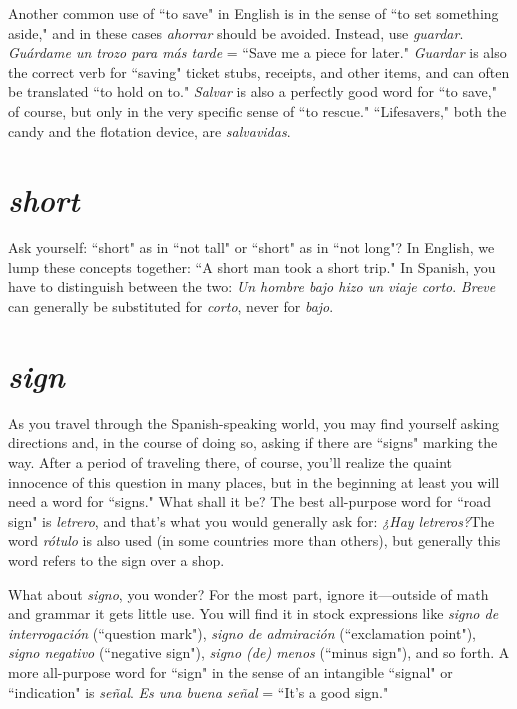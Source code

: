 Another common use of ``to save" in English is in the sense of
``to set something aside," and in these cases \emph{ahorrar} should be avoided.
Instead, use \emph{guardar}. \emph{Guárdame un trozo para más tarde} = ``Save me
a piece for later." \emph{Guardar} is also the correct verb for ``saving" ticket
stubs, receipts, and other items, and can often be translated ``to hold
on to." \emph{Salvar} is also a perfectly good word for ``to save," of course, but
only in the very specific sense of ``to rescue." ``Lifesavers," both the
candy and the flotation device, are \emph{salvavidas}.

\section{\emph{short}}

Ask yourself: ``short" as in ``not tall" or ``short" as in ``not
long"? In English, we lump these concepts together: ``A short man
took a short trip." In Spanish, you have to distinguish between the
two: \emph{Un hombre bajo hizo un viaje corto}. \emph{Breve} can generally be substituted for \emph{corto}, never for \emph{bajo}.

\section{\emph{sign}}

As you travel through the Spanish-speaking world, you may
find yourself asking directions and, in the course of doing so, asking if
there are ``signs" marking the way. After a period of traveling there, of
course, you'll realize the quaint innocence of this question in many
places, but in the beginning at least you will need a word for ``signs."
What shall it be? The best all-purpose word for ``road sign" is \emph{letrero},
and that's what you would generally ask for: \emph{¿Hay letreros?}The word
\emph{rótulo} is also used (in some countries more than others), but generally
this word refers to the sign over a shop.

What about \emph{signo}, you wonder? For the most part, ignore it---outside of math and grammar it gets little use. You will find it in stock
expressions like \emph{signo de interrogación} (``question mark"), \emph{signo de
admiración} (``exclamation point"), \emph{signo negativo} (``negative sign"),
\emph{signo (de) menos} (``minus sign"), and so forth. A more all-purpose word
for ``sign" in the sense of an intangible ``signal" or ``indication" is \emph{señal}.
\emph{Es una buena señal} = ``It's a good sign."

